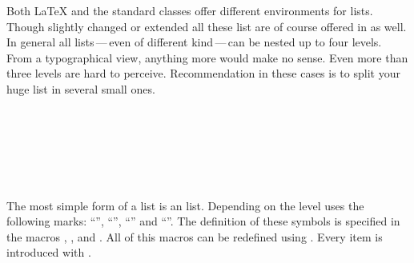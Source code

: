 Both {\LaTeX} and the standard classes offer different environments
for lists. Though slightly changed or extended all these list are of
course offered in {\KOMAScript} as well. In general all lists\,---\,even
of different kind\,---\,can be nested up to four levels. From a
typographical view, anything more would make no sense. Even more than
three levels are hard to perceive. Recommendation in these cases is to
split your huge list in several small ones.

\begin{Declaration}
  \\
  \\
  \\
  \\
  \\
\end{Declaration}%
%
%
%
%
%
%
The most simple form of a list is an  list.
Depending on the level {\KOMAScript} uses the following marks:
"`{}"', "`{}"', "`{}"' and
"`{}"'. The definition of these symbols is specified in
the macros , ,
 and . All of this macros can
be redefined using . Every item is introduced with
.
